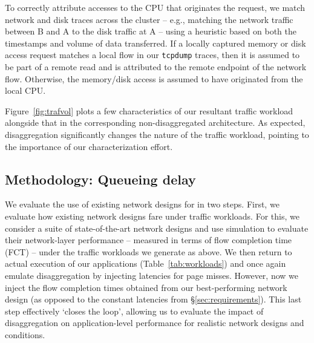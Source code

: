 
To correctly attribute accesses to the CPU that originates the request, we 
match network and disk traces across the cluster -- e.g., matching the network traffic between B and A to the disk traffic at A -- using a heuristic based on both the timestamps and volume of data transferred. 
If a locally captured memory or disk access request matches a local flow in our {\tt tcpdump} traces, then it is assumed to be part of a remote read and is attributed to the remote endpoint of the network flow.
Otherwise, the memory/disk access is assumed to have originated from the local CPU. 


Figure~\ref{fig:trafvol} plots a few characteristics of our resultant \dis traffic workload alongside that in the corresponding non-disaggregated architecture. As expected, disaggregation significantly changes the nature of the traffic workload, pointing to the importance of our characterization effort.




\subsection{Methodology: Queueing delay}
\label{ssec:ssmethod}

We evaluate the use of existing network designs for \dis in two steps.
First, we evaluate how existing network designs fare under \dis traffic workloads. 
For this, we consider a suite of state-of-the-art network designs and use simulation to evaluate their network-layer performance -- measured in terms of flow completion time (FCT) -- under the traffic workloads we generate as above.
We then return to actual execution of our applications (Table~\ref{tab:workloads}) and once again emulate disaggregation by injecting latencies for page misses. 
However, now we inject the flow completion times obtained from our best-performing network design (as opposed to the constant latencies from \S\ref{sec:requirements}). This last step effectively `closes the loop', allowing us to evaluate the impact of disaggregation on application-level performance for realistic network designs and conditions. 


